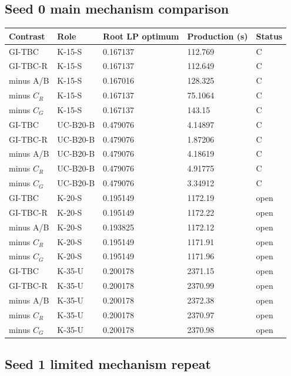 \documentclass[
  american,
  11pt,
]{article}
\newcounter{none} %
\begin{document}
\subsection{Seed 0 main mechanism
comparison}\label{seed-0-main-mechanism-comparison}

{\def\LTcaptype{none} %
\begin{longtable}[]{@{}lllll@{}}
\toprule\noalign{}
Contrast & Role & Root LP optimum & Production (s) & Status \\
\midrule\noalign{}
\endhead
\bottomrule\noalign{}
\endlastfoot
GI-TBC & K-15-S & 0.167137 & 112.769 & C \\
GI-TBC-R & K-15-S & 0.167137 & 112.649 & C \\
minus A/B & K-15-S & 0.167016 & 128.325 & C \\
minus \(C_R\) & K-15-S & 0.167137 & 75.1064 & C \\
minus \(C_G\) & K-15-S & 0.167137 & 143.15 & C \\
GI-TBC & UC-B20-B & 0.479076 & 4.14897 & C \\
GI-TBC-R & UC-B20-B & 0.479076 & 1.87206 & C \\
minus A/B & UC-B20-B & 0.479076 & 4.18619 & C \\
minus \(C_R\) & UC-B20-B & 0.479076 & 4.91775 & C \\
minus \(C_G\) & UC-B20-B & 0.479076 & 3.34912 & C \\
GI-TBC & K-20-S & 0.195149 & 1172.19 & open \\
GI-TBC-R & K-20-S & 0.195149 & 1172.22 & open \\
minus A/B & K-20-S & 0.193825 & 1172.12 & open \\
minus \(C_R\) & K-20-S & 0.195149 & 1171.91 & open \\
minus \(C_G\) & K-20-S & 0.195149 & 1171.96 & open \\
GI-TBC & K-35-U & 0.200178 & 2371.15 & open \\
GI-TBC-R & K-35-U & 0.200178 & 2370.99 & open \\
minus A/B & K-35-U & 0.200178 & 2372.38 & open \\
minus \(C_R\) & K-35-U & 0.200178 & 2370.97 & open \\
minus \(C_G\) & K-35-U & 0.200178 & 2370.98 & open \\
\end{longtable}
}

\Needspace{314pt}

\subsection{Seed 1 limited mechanism
repeat}\label{seed-1-limited-mechanism-repeat}
\end{document}
